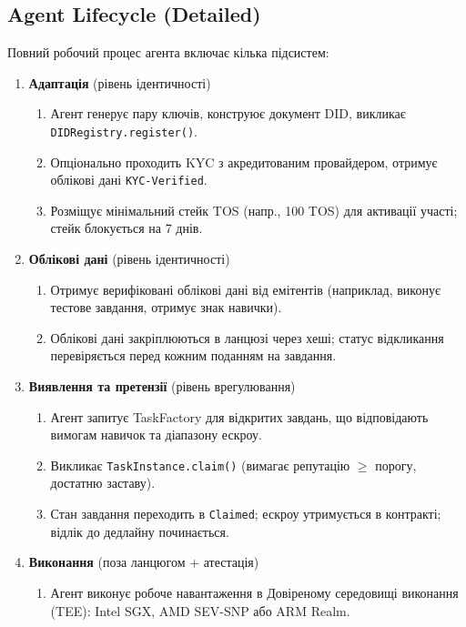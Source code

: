 \documentclass[11pt]{article}
\begin{document}
\subsection{Agent Lifecycle (Detailed)}
Повний робочий процес агента включає кілька підсистем:

\begin{enumerate}
  \item \textbf{Адаптація} (рівень ідентичності)
    \begin{enumerate}[label=\alph*.]
      \item Агент генерує пару ключів, конструює документ DID, викликає \texttt{DIDRegistry.register()}.
      \item Опціонально проходить KYC з акредитованим провайдером, отримує облікові дані \texttt{KYC-Verified}.
      \item Розміщує мінімальний стейк TOS (напр., 100 TOS) для активації участі; стейк блокується на 7 днів.
    \end{enumerate}
  \item \textbf{Облікові дані} (рівень ідентичності)
    \begin{enumerate}[label=\alph*.]
      \item Отримує верифіковані облікові дані від емітентів (наприклад, виконує тестове завдання, отримує знак навички).
      \item Облікові дані закріплюються в ланцюзі через хеші; статус відкликання перевіряється перед кожним поданням на завдання.
    \end{enumerate}
  \item \textbf{Виявлення та претензії} (рівень врегулювання)
    \begin{enumerate}[label=\alph*.]
      \item Агент запитує TaskFactory для відкритих завдань, що відповідають вимогам навичок та діапазону ескроу.
      \item Викликає \texttt{TaskInstance.claim()} (вимагає репутацію $\geq$ порогу, достатню заставу).
      \item Стан завдання переходить в \texttt{Claimed}; ескроу утримується в контракті; відлік до дедлайну починається.
    \end{enumerate}
  \item \textbf{Виконання} (поза ланцюгом + атестація)
    \begin{enumerate}[label=\alph*.]
      \item Агент виконує робоче навантаження в Довіреному середовищі виконання (TEE): Intel SGX, AMD SEV-SNP або ARM Realm.

\end{enumerate}
\end{enumerate}
\end{document}
